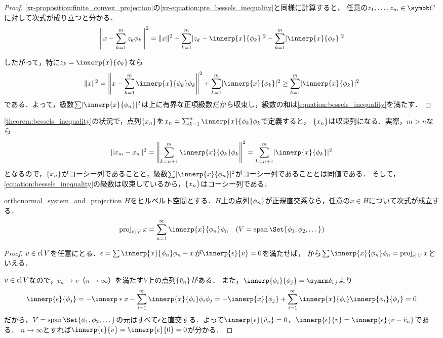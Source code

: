 \documentclass[../../main]{subfiles}
\begin{document}
\begin{proof}
  \cref{xr-proposition:finite_convex_projection}の\cref{xr-equation:pre_bessels_inequality}と同様に計算すると，
  任意の\(z_1,\dots,z_m\in\numset{C}\)に対して次式が成り立つと分かる．
  \[
    \vnorm*{x-\sum_{k=1}^mz_k\phi_k}^2 = \vnorm{x}^2+\sum_{k=1}^m\abs{z_k-\innerp{x}{\phi_k}}^2-\sum_{k=1}^m\abs{\innerp{x}{\phi_k}}^2
  \]

  したがって，特に\(z_k=\innerp{x}{\phi_k}\)なら
  \[
    \vnorm{x}^2 = \vnorm*{x-\sum_{k=1}^m\innerp{x}{\phi_k}\phi_k}^2+\sum_{k=1}^m\abs{\innerp{x}{\phi_k}}^2
    \geq \sum_{k=1}^m\abs{\innerp{x}{\phi_k}}^2
  \]
  である．よって，級数\(\sum\abs{\innerp{x}{\phi_n}}^2\)は上に有界な正項級数だから収束し，級数の和は\cref{equation:bessels_inequality}を満たす．
\end{proof}

\cref{theorem:bessels_inequality}の状況で，点列\(\lbrace x_n\rbrace\)を\(x_n=\sum_{k=1}^n\innerp{x}{\phi_k}\phi_k\)で定義すると，
\(\lbrace x_n\rbrace\)は収束列になる．実際，\(m>n\)なら
\[
  \vnorm{x_m-x_n}^2 = \vnorm*{\sum_{k=n+1}^m\innerp{x}{\phi_k}\phi_k}^2
  = \sum_{k=n+1}^m\abs{\innerp{x}{\phi_k}}^2
\]
となるので，\(\lbrace x_n\rbrace\)がコーシー列であることと，級数\(\sum\abs{\innerp{x}{\phi_n}}^2\)がコーシー列であることとは同値である．
そして，\cref{equation:bessels_inequality}の級数は収束しているから，\(\lbrace x_n\rbrace\)はコーシー列である．

\begin{proposition}{}{orthonormal_system_and_projection}
  \(H\)をヒルベルト空間とする．\(H\)上の点列\(\lbrace\phi_n\rbrace\)が正規直交系なら，任意の\(x\in H\)について次式が成立する．
  \[
    \proj_{\clsr V}x = \sum_{n=1}^\infty\innerp{x}{\phi_n}\phi_n\quad(V=\spannedby\Set{\phi_1,\phi_2,\dotsc})
  \]
\end{proposition}

\begin{proof}
  \(v\in\operatorname{cl} V\)を任意にとる．\(\epsilon=\sum\innerp{x}{\phi_n}\phi_n-x\)が\(\innerp{\epsilon}{v}=0\)を満たせば，
  から\(\sum\innerp{x}{\phi_n}\phi_n=\proj_{\clsr V}x\)といえる．

  \(v\in\operatorname{cl} V\)なので，\(\tilde{v}_n\to v\)（\(n\to\infty\)）を満たす\(V\)上の点列\(\lbrace\tilde{v}_n\rbrace\)がある．
  また，\(\innerp{\phi_i}{\phi_j}=\kdelta{i}{j}\)より
  \[
    \innerp{\epsilon}{\phi_j} = -\innerp*{x-\sum_{i=1}^\infty\innerp{x}{\phi_i}\phi_i}{\phi_j}
    = -\innerp{x}{\phi_j}+\sum_{i=1}^\infty\innerp{x}{\phi_i}\innerp{\phi_i}{\phi_j}
    = 0
  \]
  だから，\(V=\spannedby\Set{\phi_1,\phi_2,\dotsc}\)の元はすべて\(\epsilon\)と直交する．よって\(\innerp{\epsilon}{\tilde{v}_n}=0\)，\(\innerp{\epsilon}{v}=\innerp{\epsilon}{v-\tilde{v}_n}\)である．
  \(n\to\infty\)とすれば\(\innerp{\epsilon}{v}=\innerp{\epsilon}{0}=0\)が分かる．
\end{proof}
\end{document}
